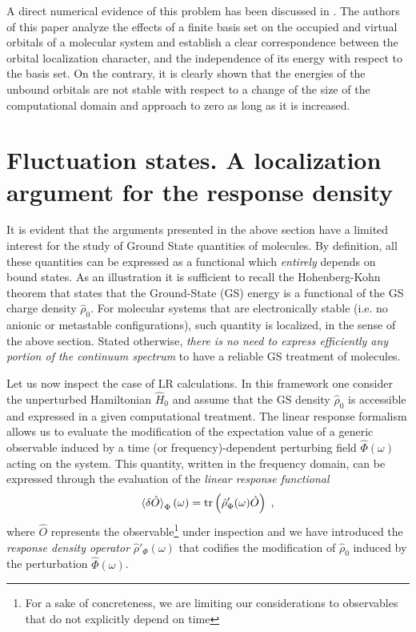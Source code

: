 \documentclass[reprint,aps,prb]{revtex4-1}
\newcommand{\be}{\begin{equation}}
\newcommand{\ee}{\end{equation}}
\newcommand{\lb}{\label}
\newcommand{\op}[1]{\hat {#1}}
\newcommand{\trace}[1]{\mathrm{tr}\left(#1\right)}
\newcommand{\dmnot}{\op{\rho}_0}
\newcommand{\dm}{\op{\rho}}
\newcommand{\hnot}{\op{H}_0}
\begin{document}
A direct numerical evidence of this problem has been discussed in \cite{boffi2016}. The authors of this paper analyze the effects of a finite basis set on the 
occupied and virtual orbitals of a molecular system and establish a clear correspondence between the orbital localization character, 
and the independence of its energy with respect to the basis set. 
On the contrary, it is clearly shown that the energies of the unbound orbitals are not stable with respect to a change of the size of the computational domain and approach to zero as long as it is increased.  


\section{Fluctuation states. A localization argument for the response density}
It is evident that the arguments presented in the above section have a limited interest for the study
of Ground State quantities of molecules. By definition, all these quantities can be expressed as a 
functional which \emph{entirely} depends on bound states. As an illustration it is sufficient to recall
the Hohenberg-Kohn theorem that states that the Ground-State (GS) energy is a functional of the GS
charge density $\dmnot$. For molecular systems that are electronically stable (i.e. no anionic or metastable configurations),
such quantity is localized, in the sense of the above section. Stated otherwise, 
\emph{there is no need to express efficiently any portion of the continuum spectrum} to have a reliable GS treatment of molecules.

Let us now inspect the case of LR calculations.
In this framework one consider the unperturbed Hamiltonian $\hnot$ and assume that 
the GS density $\dmnot$ is accessible and expressed in a given computational treatment. 
The linear response formalism allows us to evaluate the modification of the expectation value of a generic observable induced by a 
time (or frequency)-dependent perturbing field $\op\Phi(\omega)$ acting on the system. 
This quantity, written in the frequency domain, can be expressed through the evaluation of the \emph{linear response functional}
\be\lb{LinearResponseFunctDef1}
\braket{\delta\op O}_\Phi(\omega) = \trace{\dm'_\Phi(\omega)\op O} \;,
\ee
where $\op O$ represents the observable\footnote{For a sake of concreteness, we are limiting our considerations to observables that do not explicitly depend on time} under inspection 
and we have introduced the \emph{response density operator} $\dm'_\Phi(\omega)$ that codifies the modification of $\dmnot$ induced by the perturbation $\op\Phi(\omega)$. 
\end{document}
